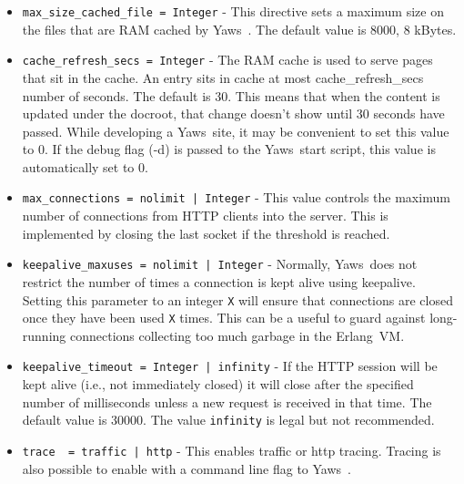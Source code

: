 \documentclass[11pt,oneside,english]{book}
\newcommand{\Erlang}            %
        {{\sc Erlang}}
\newcommand{\Yaws}            %
        {{\sc Yaws}}
\begin{document}
\begin{itemize}
\item        \verb+max_size_cached_file = Integer+ -
              This  directive  sets  a  maximum size on the files
              that are RAM cached by \Yaws\ .  The default value is
              8000, 8 kBytes.

\item        \verb+cache_refresh_secs = Integer+ -
              The  RAM  cache  is used to serve pages that sit in
              the  cache.  An  entry  sits  in  cache   at   most
              cache\_refresh\_secs  number  of seconds. The default
              is 30. This means that when the content is  updated
              under  the  docroot, that change doesn't show until
              30 seconds have passed.  While  developing  a  \Yaws\
              site,  it may be convenient to set this value to 0.
              If the debug flag (-d) is passed to the \Yaws\   start
              script, this value is automatically set to 0.

\item        \verb+max_connections = nolimit | Integer+ -
              This value controls the maximum number of connections
              from HTTP clients into the server. This is implemented
              by closing the last socket if the threshold is reached.

\item        \verb+keepalive_maxuses = nolimit | Integer+ -
              Normally, \Yaws\ does not restrict the number of times a
              connection is kept alive using keepalive. Setting this
              parameter to an integer \verb+X+ will ensure that
              connections are closed once they have been used \verb+X+
              times.  This can be a useful to guard against
              long-running connections collecting too much garbage in
              the \Erlang\ VM.

\item        \verb+keepalive_timeout = Integer | infinity+ -
              If the HTTP session will be kept alive (i.e., not
              immediately closed) it will close after the specified
              number of milliseconds unless a new request is received
              in that time. The default value is 30000. The value
              \verb+infinity+ is legal but not recommended.

\item        \verb+trace  = traffic | http+ -
              This  enables  traffic  or http tracing. Tracing is
              also possible to enable with a command line flag to
              \Yaws\ .


\end{itemize}
\end{document}
